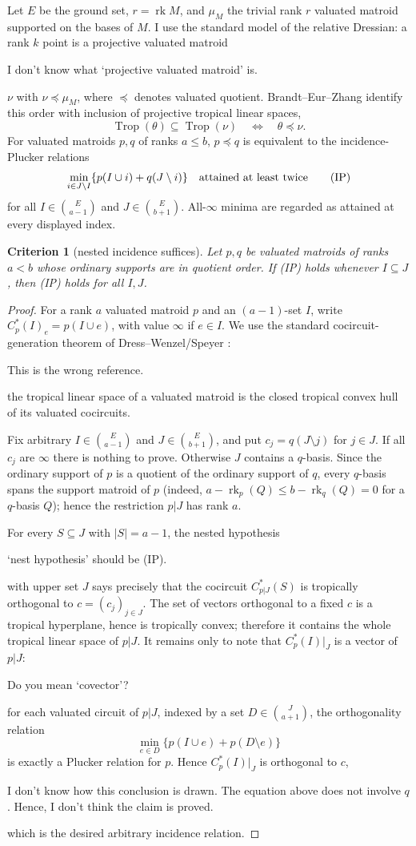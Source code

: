 \documentclass[12pt]{article}
\newcommand{\Trop}{\operatorname{Trop}}
\newcommand{\rk}{\operatorname{rk}}
\newtheorem{criterion}{Criterion}
\newcommand{\review}[1]{\begin{reviewbox}#1\end{reviewbox}}
\begin{document}
Let $E$ be the ground set, $r=\rk M$, and $\mu_M$ the trivial rank $r$
valuated matroid supported on the bases of $M$.  I use the standard
model of the relative Dressian: a rank $k$ point is a projective
valuated matroid 
\review{I don't know what `projective valuated matroid' is.}
$\nu$ with $\nu\preceq\mu_M$, where $\preceq$ denotes
valuated quotient.  Brandt--Eur--Zhang \cite{BEZ} identify this order with
inclusion of projective tropical linear spaces,
\[
        \Trop(\theta)\subseteq\Trop(\nu)
        \quad\Longleftrightarrow\quad \theta\preceq\nu .
\]
For valuated matroids $p,q$ of ranks $a\le b$, $p\preceq q$ is
equivalent to the incidence-Plucker relations
\[
 \min_{i\in J\setminus I}\{p(I\cup i)+q(J\setminus i)\}
 \quad\hbox{attained at least twice}                         \tag{IP}
\]
for all $I\in\binom{E}{a-1}$ and $J\in\binom{E}{b+1}$.  All-$\infty$
minima are regarded as attained at every displayed index.

\begin{criterion}[nested incidence suffices]\label{crit:local}
Let $p,q$ be valuated matroids of ranks $a<b$ whose ordinary supports
are in quotient order.  If {\rm (IP)} holds whenever $I\subseteq J$,
then {\rm (IP)} holds for all $I,J$.
\end{criterion}

\begin{proof}
For a rank $a$ valuated matroid $p$ and an $(a-1)$-set $I$, write
$C^*_p(I)_e=p(I\cup e)$, with value $\infty$ if $e\in I$.  We use the
standard cocircuit-generation theorem of Dress--Wenzel/Speyer \cite{DW,Speyer}: 
\review{This is the wrong reference.}
the
tropical linear space of a valuated matroid is the closed tropical convex
hull of its valuated cocircuits.

Fix arbitrary $I\in\binom{E}{a-1}$ and $J\in\binom{E}{b+1}$, and put
$c_j=q(J\setminus j)$ for $j\in J$.  If all $c_j$ are $\infty$ there is
nothing to prove.  Otherwise $J$ contains a $q$-basis.  Since the
ordinary support of $p$ is a quotient of the ordinary support of $q$,
every $q$-basis spans the support matroid of $p$ (indeed,
$a-\rk_p(Q)\le b-\rk_q(Q)=0$ for a $q$-basis $Q$); hence the
restriction $p|J$ has rank $a$.

For every $S\subseteq J$ with $|S|=a-1$, the nested hypothesis 
\review{`nest hypothesis' should be (IP).}
with
upper set $J$ says precisely that the cocircuit $C^*_{p|J}(S)$ is
tropically orthogonal to $c=(c_j)_{j\in J}$.  The set of vectors
orthogonal to a fixed $c$ is a tropical hyperplane, hence is tropically
convex; therefore it contains the whole tropical linear space of $p|J$.
It remains only to note that $C^*_p(I)|_J$ is a vector of $p|J$: 
\review{Do you mean `covector'?}
for
each valuated circuit of $p|J$, indexed by a set
$D\in\binom{J}{a+1}$, the orthogonality relation
\[
 \min_{e\in D}\{p(I\cup e)+p(D\setminus e)\}
\]
is exactly a Plucker relation for $p$.
Hence $C^*_p(I)|_J$ is
orthogonal to $c$,
\review{I don't know how this conclusion is drawn. The equation above does not involve $q$. Hence, I don't think the claim is proved.}
which is the desired arbitrary incidence relation.
\end{proof}
\end{document}
